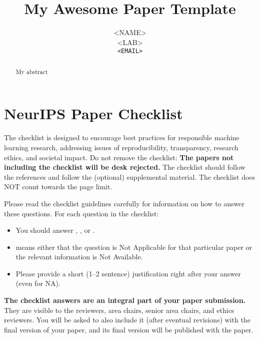 \documentclass{article}
\title{My Awesome Paper Template}
\author{%
  <NAME>\\
  <LAB>\\
  \texttt{<EMAIL>} \\
}
\begin{document}
\maketitle

\begin{abstract}
  My abstract
\end{abstract}















\newpage
\section*{NeurIPS Paper Checklist}

The checklist is designed to encourage best practices for responsible machine learning research, addressing issues of reproducibility, transparency, research ethics, and societal impact. Do not remove the checklist: {\bf The papers not including the checklist will be desk rejected.} The checklist should follow the references and follow the (optional) supplemental material.  The checklist does NOT count towards the page
limit.

Please read the checklist guidelines carefully for information on how to answer these questions. For each question in the checklist:
\begin{itemize}
    \item You should answer \answerYes{}, \answerNo{}, or \answerNA{}.
    \item \answerNA{} means either that the question is Not Applicable for that particular paper or the relevant information is Not Available.
    \item Please provide a short (1–2 sentence) justification right after your answer (even for NA).
\end{itemize}

{\bf The checklist answers are an integral part of your paper submission.} They are visible to the reviewers, area chairs, senior area chairs, and ethics reviewers. You will be asked to also include it (after eventual revisions) with the final version of your paper, and its final version will be published with the paper.
\end{document}
